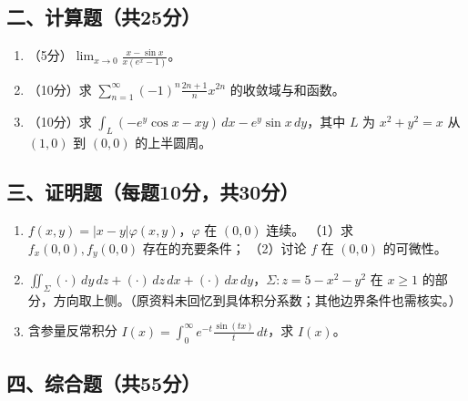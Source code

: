 \documentclass[11pt,fontset=fandol]{ctexart}
\begin{document}
\subsection{二、计算题（共25分）}\label{ux4e8cux8ba1ux7b97ux9898ux517125ux5206}

\begin{enumerate}
\def\labelenumi{\arabic{enumi}.}
\item
  （5分）\(\displaystyle\lim_{x\to0}\frac{x-\sin x}{x(e^x-1)}\)。
\item
  （10分）求
  \(\displaystyle\sum_{n=1}^\infty(-1)^n\frac{2n+1}{n}x^{2n}\)
  的收敛域与和函数。
\item
  （10分）求
  \(\displaystyle\int_L(-e^y\cos x-xy)\,dx-e^y\sin x\,dy\)，其中 \(L\)
  为 \(x^2+y^2=x\) 从 \((1,0)\) 到 \((0,0)\) 的上半圆周。
\end{enumerate}

\subsection{三、证明题（每题10分，共30分）}\label{ux4e09ux8bc1ux660eux9898ux6bcfux989810ux5206ux517130ux5206}

\begin{enumerate}
\def\labelenumi{\arabic{enumi}.}
\item
  \(f(x,y)=|x-y|\varphi(x,y)\)，\(\varphi\) 在 \((0,0)\) 连续。 （1）求
  \(f_x(0,0),f_y(0,0)\) 存在的充要条件； （2）讨论 \(f\) 在 \((0,0)\)
  的可微性。
\item
  \(\displaystyle\iint_\Sigma(\cdot)\,dy\,dz+(\cdot)\,dz\,dx+(\cdot)\,dx\,dy\)，\(\Sigma:z=5-x^2-y^2\)
  在 \(x\ge1\)
  的部分，方向取上侧。（原资料未回忆到具体积分系数；其他边界条件也需核实。）
\item
  含参量反常积分
  \(\displaystyle I(x)=\int_0^\infty e^{-t}\frac{\sin(tx)}t\,dt\)，求
  \(I(x)\)。
\end{enumerate}

\subsection{四、综合题（共55分）}\label{ux56dbux7efcux5408ux9898ux517155ux5206}
\end{document}
